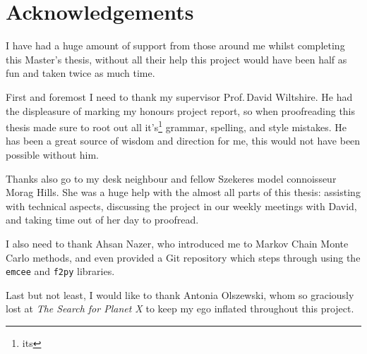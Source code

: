 \documentclass[a4paper,12pt]{report}
\begin{document}
\chapter*{Acknowledgements}
I have had a huge amount of support from those around me whilst completing this Master's thesis, without all their help this project would have been half as fun and taken twice as much time.

First and foremost I need to thank my supervisor Prof.\,David Wiltshire. He had the displeasure of marking my honours project report, so when proofreading this thesis made sure to root out all it's\footnote{its} grammar, spelling, and style mistakes. He has been a great source of wisdom and direction for me, this would not have been possible without him.

Thanks also go to my desk neighbour and fellow Szekeres model connoisseur Morag Hills. She was a huge help with the almost all parts of this thesis: assisting with technical aspects, discussing the project in our weekly meetings with David, and taking time out of her day to proofread.

I also need to thank Ahsan Nazer, who introduced me to Markov Chain Monte Carlo methods, and even provided a Git repository which steps through using the \texttt{emcee} and \texttt{f2py} libraries.

Last but not least, I would like to thank Antonia Olszewski, whom so graciously lost at \textit{The Search for Planet X} to keep my ego inflated throughout this project.


\tableofcontents






\end{document}
